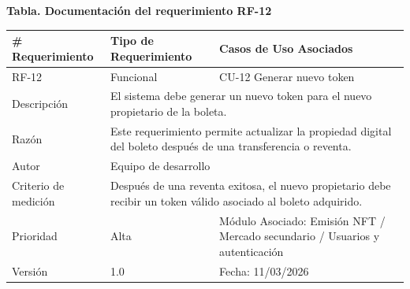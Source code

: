 \documentclass[12pt,letterpaper]{article}
\begin{document}
\noindent
\begin{minipage}{\textwidth}
\centering
\scriptsize
\renewcommand{\arraystretch}{0.9}
\setlength{\tabcolsep}{3pt}
\setlength{\arrayrulewidth}{0.5pt}

\textbf{Tabla. Documentación del requerimiento RF-12}

\vspace{2pt}

\begin{tabularx}{\textwidth}{|p{2.6cm}|X|p{3.4cm}|}
\hline
\# Requerimiento & Tipo de Requerimiento & Casos de Uso Asociados \\ \hline
RF-12 & Funcional & CU-12 Generar nuevo token \\ \hline
Descripción & \multicolumn{2}{X|}{El sistema debe generar un nuevo token para el nuevo propietario de la boleta.} \\ \hline
Razón & \multicolumn{2}{X|}{Este requerimiento permite actualizar la propiedad digital del boleto después de una transferencia o reventa.} \\ \hline
Autor & \multicolumn{2}{X|}{Equipo de desarrollo} \\ \hline
Criterio de medición & \multicolumn{2}{X|}{Después de una reventa exitosa, el nuevo propietario debe recibir un token válido asociado al boleto adquirido.} \\ \hline
Prioridad & Alta & Módulo Asociado: Emisión NFT / Mercado secundario / Usuarios y autenticación \\ \hline
Versión & 1.0 & Fecha: 11/03/2026 \\ \hline
\end{tabularx}
\end{minipage}

\vspace{0.2cm}
\end{document}
